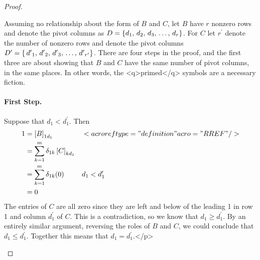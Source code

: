 \documentclass{ximera}
\begin{document}
\begin{theorem}
\begin{proof}
\begin{expandable}
Assuming no relationship about the form of $B$ and $C$, let $B$ have $r$ nonzero rows and denote the pivot columns as $D=\left\{{d}_{1},\,{d}_{2},\,{d}_{3},\,\ldots,\,{d}_{r}\right\}$.  For $C$ let $r^\prime$ denote the number of nonzero rows and denote the pivot columns $D^\prime=\left\{\,{d^\prime}_{1},\,{d^\prime}_{2},\,{d^\prime}_{3},\,\ldots,\,{d^\prime}_{r^\prime}\right\}$.  There are four steps in the proof, and the first three are about showing that $B$ and $C$ have the same number of pivot columns, in the same places.  In other words, the <q>primed</q> symbols are a necessary fiction.

\paragraph*{First Step.}  Suppose that $d_1 < d^\prime_1$.  Then
\begin{align*}
1
&=\left\lbrack B\right\rbrack_{1d_1}
&&<acroref type="definition" acro="RREF" />\\
&=\sum_{k=1}^{m}\delta_{1k}\left\lbrack C\right\rbrack_{kd_1}\\
&=\sum_{k=1}^{m}\delta_{1k}(0)
&&d_1<d^\prime_1\\
&=0
\end{align*}
The entries of $C$ are all zero since they are left and below of the leading 1 in row 1 and column $d^\prime_1$ of $C$.  This is a contradiction, so we know that $d_1\geq d^\prime_1$.  By an entirely similar argument, reversing the roles of $B$ and $C$, we could conclude that $d_1\leq d^\prime_1$.  Together this means that $d_1=d^\prime_1$.</p>


\end{expandable}
\end{proof}
\end{theorem}
\end{document}
